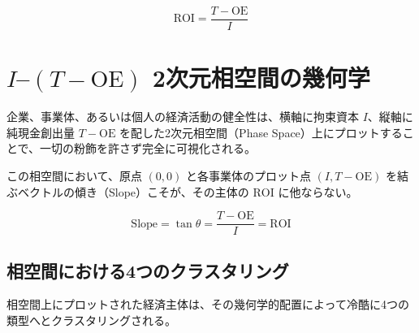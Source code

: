 \begin{equation}
    \mathrm{ROI} = \frac{T - \mathrm{OE}}{I}
\end{equation}

\section{\(I\)--\((T - \mathrm{OE})\) 2次元相空間の幾何学}

企業、事業体、あるいは個人の経済活動の健全性は、横軸に拘束資本 \(I\)、縦軸に純現金創出量 \(T - \mathrm{OE}\) を配した2次元相空間（Phase Space）上にプロットすることで、一切の粉飾を許さず完全に可視化される。

この相空間において、原点 \((0, 0)\) と各事業体のプロット点 \((I, T - \mathrm{OE})\) を結ぶベクトルの傾き（Slope）こそが、その主体の \(\mathrm{ROI}\) に他ならない。

\begin{equation}
    \mathrm{Slope} = \tan \theta = \frac{T - \mathrm{OE}}{I} = \mathrm{ROI}
\end{equation}

\subsection{相空間における4つのクラスタリング}

相空間上にプロットされた経済主体は、その幾何学的配置によって冷酷に4つの類型へとクラスタリングされる。

